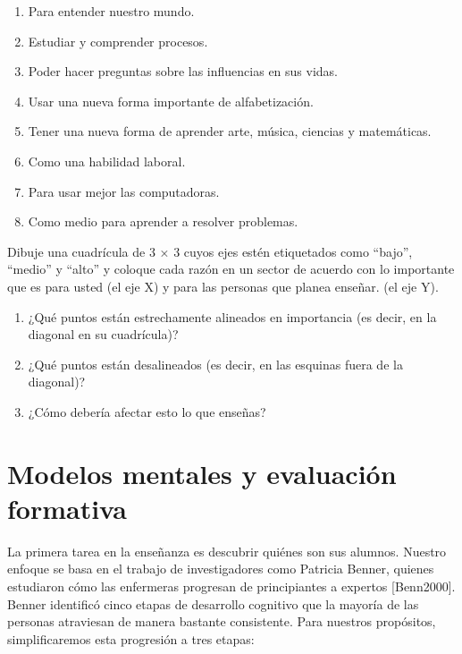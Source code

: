 \documentclass[
]{book}
\begin{document}
\begin{enumerate}
\def\labelenumi{\arabic{enumi}.}
\item
  Para entender nuestro mundo.
\item
  Estudiar y comprender procesos.
\item
  Poder hacer preguntas sobre las influencias en sus vidas.
\item
  Usar una nueva forma importante de alfabetización.
\item
  Tener una nueva forma de aprender arte, música, ciencias y matemáticas.
\item
  Como una habilidad laboral.
\item
  Para usar mejor las computadoras.
\item
  Como medio para aprender a resolver problemas.
\end{enumerate}

Dibuje una cuadrícula de 3 × 3 cuyos ejes estén etiquetados como ``bajo'', ``medio'' y ``alto'' y coloque cada razón en un sector de acuerdo con lo importante que es para usted (el eje X) y para las personas que planea enseñar. (el eje Y).

\begin{enumerate}
\def\labelenumi{\arabic{enumi}.}
\item
  ¿Qué puntos están estrechamente alineados en importancia (es decir, en la diagonal en su cuadrícula)?
\item
  ¿Qué puntos están desalineados (es decir, en las esquinas fuera de la diagonal)?
\item
  ¿Cómo debería afectar esto lo que enseñas?
\end{enumerate}

\hypertarget{modelos-mentales-y-evaluaciuxf3n-formativa}{%
\chapter{Modelos mentales y evaluación formativa}\label{modelos-mentales-y-evaluaciuxf3n-formativa}}

La primera tarea en la enseñanza es descubrir quiénes son sus alumnos. Nuestro enfoque se basa en el trabajo de investigadores como Patricia Benner, quienes estudiaron cómo las enfermeras progresan de principiantes a expertos {[}Benn2000{]}. Benner identificó cinco etapas de desarrollo cognitivo que la mayoría de las personas atraviesan de manera bastante consistente. Para nuestros propósitos, simplificaremos esta progresión a tres etapas:
\end{document}
